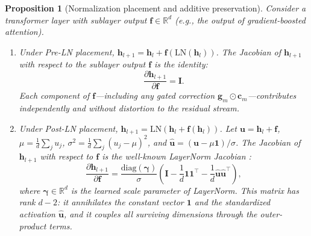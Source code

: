 \documentclass{article}
\newtheorem{proposition}{Proposition}
\theoremstyle{definition}
\begin{document}
\begin{proposition}[Normalization placement and additive preservation]
\label{prop:normalization}
Consider a transformer layer with sublayer output $\mathbf{f} \in \mathbb{R}^d$ (e.g., the output of gradient-boosted attention).
\begin{enumerate}
    \item[(a)] Under Pre-LN placement, $\mathbf{h}_{l+1} = \mathbf{h}_l + \mathbf{f}(\mathrm{LN}(\mathbf{h}_l))$.
    The Jacobian of $\mathbf{h}_{l+1}$ with respect to the sublayer output $\mathbf{f}$ is the identity:
    \begin{equation}
    \frac{\partial \mathbf{h}_{l+1}}{\partial \mathbf{f}} = \mathbf{I}.
    \end{equation}
    Each component of $\mathbf{f}$---including any gated correction $\mathbf{g}_m \odot \mathbf{c}_m$---contributes independently and without distortion to the residual stream.

    \item[(b)] Under Post-LN placement, $\mathbf{h}_{l+1} = \mathrm{LN}(\mathbf{h}_l + \mathbf{f}(\mathbf{h}_l))$.
    Let $\mathbf{u} = \mathbf{h}_l + \mathbf{f}$, $\mu = \frac{1}{d}\sum_j u_j$, $\sigma^2 = \frac{1}{d}\sum_j (u_j - \mu)^2$, and $\hat{\mathbf{u}} = (\mathbf{u} - \mu\mathbf{1})/\sigma$.
    The Jacobian of $\mathbf{h}_{l+1}$ with respect to $\mathbf{f}$ is the well-known LayerNorm Jacobian \citep{xiong2020layer}:
    \begin{equation}
    \label{eq:ln_jacobian}
    \frac{\partial \mathbf{h}_{l+1}}{\partial \mathbf{f}} = \frac{\mathrm{diag}(\boldsymbol{\gamma})}{\sigma}\left(\mathbf{I} - \frac{1}{d}\mathbf{1}\mathbf{1}^\top - \frac{1}{d}\hat{\mathbf{u}}\hat{\mathbf{u}}^\top\right),
    \end{equation}
    where $\boldsymbol{\gamma} \in \mathbb{R}^d$ is the learned scale parameter of LayerNorm.
    This matrix has rank $d - 2$: it annihilates the constant vector $\mathbf{1}$ and the standardized activation $\hat{\mathbf{u}}$, and it couples all surviving dimensions through the outer-product terms.
\end{enumerate}
\end{proposition}
\end{document}
